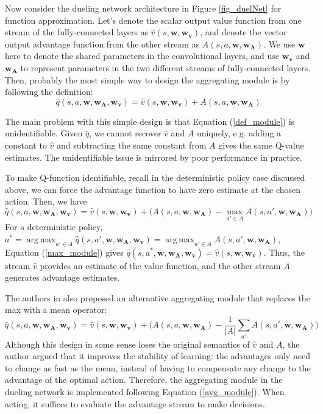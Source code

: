\documentclass{article}
\newcommand{\w}{\mathbf{w}}
\newcommand{\wa}{\mathbf{w_A}}
\newcommand{\wv}{\mathbf{w_v}}
\DeclareMathOperator*{\argmax}{arg\,max}
\begin{document}
Now consider the dueling network architecture in Figure \ref{fig_duelNet} for function approximation. Let's denote the scalar output value function from one stream of the fully-connected layers as $\hat{v}(s, \w, \wv)$, and denote the vector output advantage function from the other stream as $A(s, a, \w, \wa)$. We use $\w$ here to denote the shared parameters in the convolutional layers, and use $\wv$ and $\wa$ to represent parameters in the two different streams of fully-connected layers. Then, probably the most simple way to design the aggregating module is by following the definition:
\begin{equation} \label{def_module}
\hat{q}(s, a, \w, \wa, \wv) = \hat{v}(s, \w, \wv) + A(s, a, \w, \wa)
\end{equation}

The main problem with this simple design is that Equation (\ref{def_module}) is unidentifiable. Given $\hat{q}$, we cannot recover $\hat{v}$ and $A$ uniquely, e.g. adding a constant to $\hat{v}$ and subtracting the same constant from $A$ gives the same Q-value estimates. The unidentifiable issue is mirrored by poor performance in practice.

To make Q-function identifiable, recall in the deterministic policy case discussed above, we can force the advantage function to have zero estimate at the chosen action. Then, we have
\begin{equation} \label{max_module}
\hat{q}(s, a, \w, \wa, \wv)
= \hat{v}(s, \w, \wv) + \Big(A(s, a, \w, \wa) - \max_{a' \in A} A(s, a', \w, \wa) \Big)
\end{equation}
For a deterministic policy, $a^* = \argmax_{a' \in A} \hat{q}(s,a', \w, \wa, \wv) = \argmax_{a' \in A} A(s, a', \w, \wa)$, Equation (\ref{max_module}) gives $\hat{q}(s, a^*, \w, \wa, \wv) = \hat{v}(s, \w, \wv)$. Thus, the stream $\hat{v}$ provides an estimate of the value function, and the other stream $A$ generates advantage estimates.

The authors in \cite{ref_DuelingDQN} also proposed an alternative aggregating module that replaces the max with a mean operator:
\begin{equation} \label{avg_module}
\hat{q}(s, a, \w, \wa, \wv)
= \hat{v}(s, \w, \wv) + \Big(A(s, a, \w, \wa) - \frac{1}{|A|} \sum_{a'} A(s, a', \w, \wa) \Big)
\end{equation}
Although this design in some sense loses the original semantics of $\hat{v}$ and $A$, the author argued that it improves the stability of learning: the advantages only need to change as fast as the mean, instead of having to compensate any change to the advantage of the optimal action. Therefore, the aggregating module in the dueling network \cite{ref_DuelingDQN} is implemented following Equation (\ref{avg_module}). When acting, it suffices to evaluate the advantage stream to make decisions.
\end{document}
